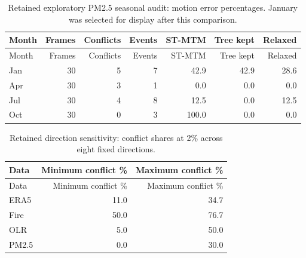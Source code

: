 \begingroup\small\setlength{\tabcolsep}{4pt}
\begin{longtable}{lrrrrrr}
\caption{Retained exploratory PM2.5 seasonal audit: motion error percentages. January was selected for display after this comparison.}\\\toprule
Month & Frames & Conflicts & Events & ST-MTM & Tree kept & Relaxed\\\midrule\endfirsthead
\toprule Month & Frames & Conflicts & Events & ST-MTM & Tree kept & Relaxed\\\midrule\endhead
\bottomrule\endfoot
Jan & 30 & 5 & 7 & 42.9 & 42.9 & 28.6\\
Apr & 30 & 3 & 1 & 0.0 & 0.0 & 0.0\\
Jul & 30 & 4 & 8 & 12.5 & 0.0 & 12.5\\
Oct & 30 & 0 & 3 & 100.0 & 0.0 & 0.0\\
\end{longtable}\endgroup

\begingroup\small\setlength{\tabcolsep}{4pt}
\begin{longtable}{lrr}
\caption{Retained direction sensitivity: conflict shares at 2\% across eight fixed directions.}\\\toprule
Data & Minimum conflict \% & Maximum conflict \%\\\midrule\endfirsthead
\toprule Data & Minimum conflict \% & Maximum conflict \%\\\midrule\endhead
\bottomrule\endfoot
ERA5 & 11.0 & 34.7\\
Fire & 50.0 & 76.7\\
OLR & 5.0 & 50.0\\
PM2.5 & 0.0 & 30.0\\
\end{longtable}\endgroup
